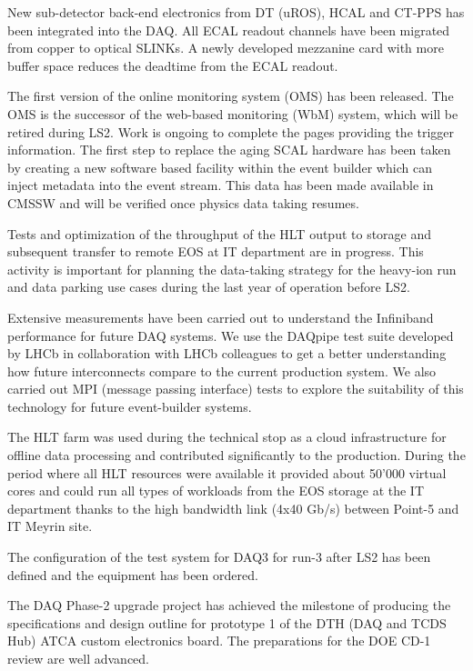 \documentclass[12pt]{article}
\begin{document}
New sub-detector back-end electronics from DT (uROS), HCAL and CT-PPS has been integrated into the DAQ. All ECAL readout channels have been migrated from copper to optical SLINKs. A newly developed mezzanine card with more buffer space reduces the deadtime from the ECAL readout. 

The first version of the online monitoring system (OMS) has been released. The OMS is the successor of the web-based monitoring (WbM) system, which will be retired during LS2. Work is ongoing to complete the pages providing the trigger information. The first step to replace the aging SCAL hardware has been taken by creating a new software based facility within the event builder which can inject metadata into the event stream. This data has been made available in CMSSW and will be verified once physics data taking resumes. 

Tests and optimization of the throughput of the HLT output to storage and subsequent transfer to remote EOS at IT department are in progress. This activity is important for planning the data-taking strategy for the heavy-ion run and data parking use cases during the last year of operation before LS2.

Extensive measurements have been carried out to understand the Infiniband performance for future DAQ systems. We use the DAQpipe test suite developed by LHCb in collaboration with LHCb colleagues to get a better understanding how future interconnects compare to the current production system. We also carried out MPI (message passing interface) tests to explore the suitability of this technology for future event-builder systems.

The HLT farm was used during the technical stop as a cloud infrastructure for offline data processing and contributed significantly to the production. During the period where all HLT resources were available it provided about 50’000 virtual cores and could run all types of workloads from the EOS storage at the IT department thanks to the high bandwidth link (4x40 Gb/s) between Point-5 and IT Meyrin site.

The configuration of the test system for DAQ3 for run-3 after LS2 has been defined and the equipment has been ordered.

The DAQ Phase-2 upgrade project has achieved the milestone of producing the specifications and design outline for prototype 1 of the DTH (DAQ and TCDS Hub) ATCA custom electronics board. The preparations for the DOE CD-1 review are well advanced.
\end{document}
